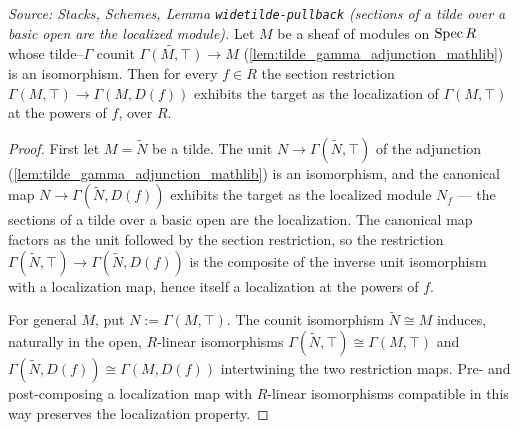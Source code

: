 \begin{lemma}
  \label{lem:isLocalizedModule_restrict_of_isIso_fromTildeΓ}
  \leanok
  \textit{Source: Stacks, Schemes, Lemma \texttt{widetilde-pullback} (sections of a
  tilde over a basic open are the localized module).}
  Let \(M\) be a sheaf of modules on \(\operatorname{Spec} R\) whose tilde--\(\Gamma\) counit
  \(\widetilde{\Gamma(M, \top)} \to M\) (\cref{lem:tilde_gamma_adjunction_mathlib}) is an
  isomorphism. Then for every \(f \in R\) the section restriction
  \(\Gamma(M, \top) \to \Gamma(M, D(f))\) exhibits the target as the localization of
  \(\Gamma(M, \top)\) at the powers of \(f\), over \(R\).
\end{lemma}
\begin{proof}
  \leanok
  First let \(M = \widetilde{N}\) be a tilde. The unit
  \(N \to \Gamma(\widetilde{N}, \top)\) of the adjunction
  (\cref{lem:tilde_gamma_adjunction_mathlib}) is an isomorphism, and the canonical map
  \(N \to \Gamma(\widetilde{N}, D(f))\) exhibits the target as the localized module
  \(N_f\) — the sections of a tilde over a basic open are the localization. The
  canonical map factors as the unit followed by the section restriction, so the
  restriction \(\Gamma(\widetilde{N}, \top) \to \Gamma(\widetilde{N}, D(f))\) is the
  composite of the inverse unit isomorphism with a localization map, hence itself a
  localization at the powers of \(f\).

  For general \(M\), put \(N := \Gamma(M, \top)\). The counit isomorphism
  \(\widetilde{N} \cong M\) induces, naturally in the open, \(R\)-linear isomorphisms
  \(\Gamma(\widetilde{N}, \top) \cong \Gamma(M, \top)\) and
  \(\Gamma(\widetilde{N}, D(f)) \cong \Gamma(M, D(f))\) intertwining the two restriction
  maps. Pre- and post-composing a localization map with \(R\)-linear isomorphisms
  compatible in this way preserves the localization property.
\end{proof}

